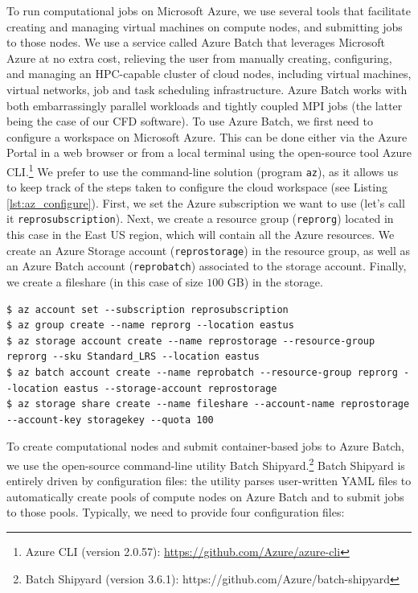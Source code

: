 \documentclass[10pt,journal,compsoc]{IEEEtran}
\begin{document}
To run computational jobs on Microsoft Azure, we use several tools that facilitate creating and managing virtual machines on compute nodes, and submitting jobs to those nodes.
We use a service called Azure Batch that leverages Microsoft Azure at no extra cost, relieving the user from manually creating, configuring, and managing an HPC-capable cluster of cloud nodes, including virtual machines, virtual networks, job and task scheduling infrastructure.
Azure Batch works with both embarrassingly parallel workloads and tightly coupled MPI jobs (the latter being the case of our CFD software).
To use Azure Batch, we first need to configure a workspace on Microsoft Azure.
This can be done either via the Azure Portal in a web browser or from a local terminal using the open-source tool Azure CLI.\footnote{Azure CLI (version 2.0.57): \url{https://github.com/Azure/azure-cli}}
We prefer to use the command-line solution (program \texttt{az}), as it allows us to keep track of the steps taken to configure the cloud workspace (see Listing \ref{lst:az_configure}).
First, we set the Azure subscription we want to use (let's call it \texttt{reprosubscription}).
Next, we create a resource group (\texttt{reprorg}) located in this case in the East US region, which will contain all the Azure resources.
We create an Azure Storage account (\texttt{reprostorage}) in the resource group, as well as an Azure Batch account (\texttt{reprobatch}) associated to the storage account.
Finally, we create a fileshare (in this case of size $100$ GB) in the storage.

\begin{lstlisting}[label=lst:az_configure,caption={Configure the workspace on Microsoft Azure.}]
$ az account set --subscription reprosubscription
$ az group create --name reprorg --location eastus
$ az storage account create --name reprostorage --resource-group reprorg --sku Standard_LRS --location eastus
$ az batch account create --name reprobatch --resource-group reprorg --location eastus --storage-account reprostorage
$ az storage share create --name fileshare --account-name reprostorage --account-key storagekey --quota 100
\end{lstlisting}

To create computational nodes and submit container-based jobs to Azure Batch, we use the open-source command-line utility Batch Shipyard.\footnote{Batch Shipyard (version 3.6.1): https://github.com/Azure/batch-shipyard}
Batch Shipyard is entirely driven by configuration files: the utility parses user-written YAML files to automatically create pools of compute nodes on Azure Batch and to submit jobs to those pools.
Typically, we need to provide four configuration files:
\end{document}
